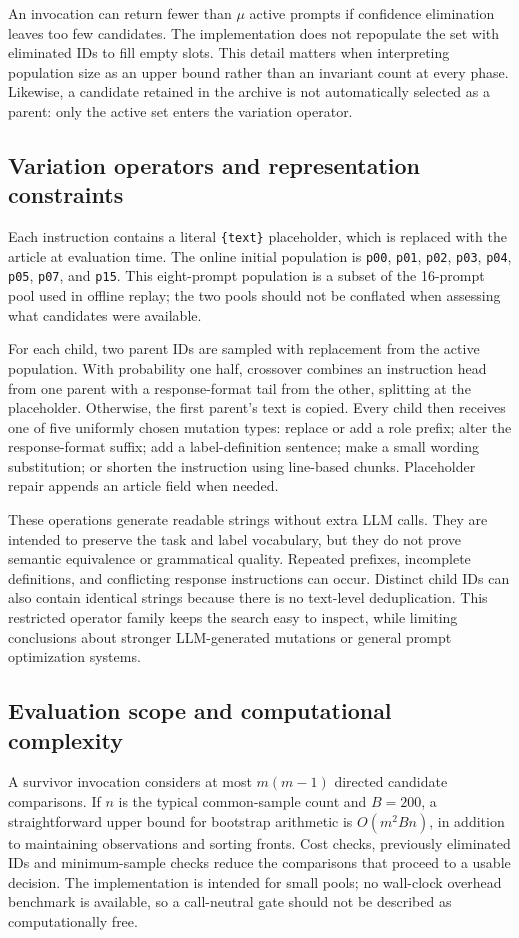 An invocation can return fewer than $\mu$ active prompts if confidence elimination
leaves too few candidates. The implementation does not repopulate the set with
eliminated IDs to fill empty slots. This detail matters when interpreting
population size as an upper bound rather than an invariant count at every phase.
Likewise, a candidate retained in the archive is not automatically selected as a
parent: only the active set enters the variation operator.

\subsection{Variation operators and representation constraints}
Each instruction contains a literal \texttt{\{text\}} placeholder, which is
replaced with the article at evaluation time. The online initial population is
\texttt{p00}, \texttt{p01}, \texttt{p02}, \texttt{p03}, \texttt{p04},
\texttt{p05}, \texttt{p07}, and \texttt{p15}. This eight-prompt population is a
subset of the 16-prompt pool used in offline replay; the two pools should not be
conflated when assessing what candidates were available.

For each child, two parent IDs are sampled with replacement from the active
population. With probability one half, crossover combines an instruction head
from one parent with a response-format tail from the other, splitting at the
placeholder. Otherwise, the first parent's text is copied. Every child then
receives one of five uniformly chosen mutation types: replace or add a role
prefix; alter the response-format suffix; add a label-definition sentence;
make a small wording substitution; or shorten the instruction using line-based
chunks. Placeholder repair appends an article field when needed.

These operations generate readable strings without extra LLM calls. They are
intended to preserve the task and label vocabulary, but they do not prove semantic
equivalence or grammatical quality. Repeated prefixes, incomplete definitions,
and conflicting response instructions can occur. Distinct child IDs can also
contain identical strings because there is no text-level deduplication. This
restricted operator family keeps the search easy to inspect, while
limiting conclusions about stronger LLM-generated mutations or general prompt
optimization systems.

\subsection{Evaluation scope and computational complexity}
A survivor invocation considers at most $m(m-1)$ directed candidate comparisons.
If $n$ is the typical common-sample count and $B=200$, a straightforward upper
bound for bootstrap arithmetic is $O(m^2Bn)$, in addition to maintaining
observations and sorting fronts. Cost checks, previously eliminated IDs and
minimum-sample checks reduce the comparisons that proceed to a usable decision.
The implementation is intended for small pools; no wall-clock overhead benchmark
is available, so a call-neutral gate should not be described as computationally
free.

